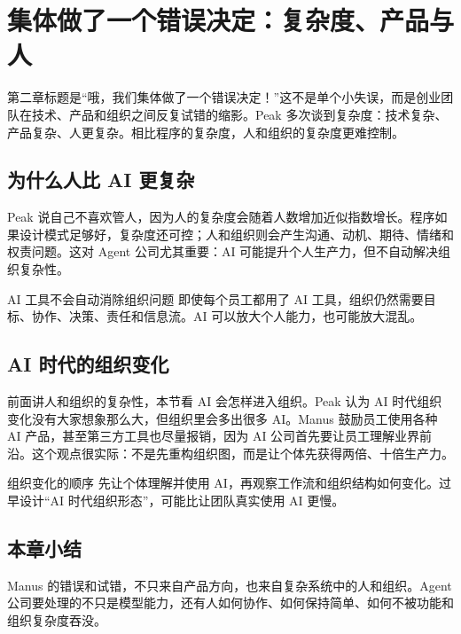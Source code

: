 \section{集体做了一个错误决定：复杂度、产品与人}

第二章标题是“哦，我们集体做了一个错误决定！”这不是单个小失误，而是创业团队在技术、产品和组织之间反复试错的缩影。Peak 多次谈到复杂度：技术复杂、产品复杂、人更复杂。相比程序的复杂度，人和组织的复杂度更难控制。

\subsection{为什么人比 AI 更复杂}

Peak 说自己不喜欢管人，因为人的复杂度会随着人数增加近似指数增长。程序如果设计模式足够好，复杂度还可控；人和组织则会产生沟通、动机、期待、情绪和权责问题。这对 Agent 公司尤其重要：AI 可能提升个人生产力，但不自动解决组织复杂性。

\begin{warningbox}{AI 工具不会自动消除组织问题}
即使每个员工都用了 AI 工具，组织仍然需要目标、协作、决策、责任和信息流。AI 可以放大个人能力，也可能放大混乱。
\end{warningbox}

\subsection{AI 时代的组织变化}

前面讲人和组织的复杂性，本节看 AI 会怎样进入组织。Peak 认为 AI 时代组织变化没有大家想象那么大，但组织里会多出很多 AI。Manus 鼓励员工使用各种 AI 产品，甚至第三方工具也尽量报销，因为 AI 公司首先要让员工理解业界前沿。这个观点很实际：不是先重构组织图，而是让个体先获得两倍、十倍生产力。

\begin{importantbox}{组织变化的顺序}
先让个体理解并使用 AI，再观察工作流和组织结构如何变化。过早设计“AI 时代组织形态”，可能比让团队真实使用 AI 更慢。
\end{importantbox}

\subsection{本章小结}

Manus 的错误和试错，不只来自产品方向，也来自复杂系统中的人和组织。Agent 公司要处理的不只是模型能力，还有人如何协作、如何保持简单、如何不被功能和组织复杂度吞没。

